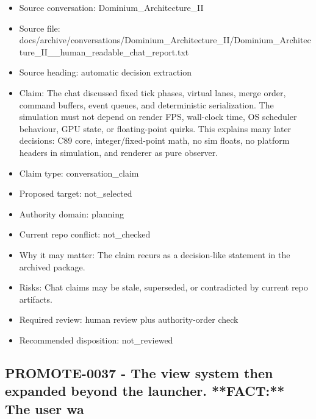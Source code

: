 \documentclass[11pt,a4paper]{report}
\begin{document}
\begin{itemize}
\item Source conversation: Dominium\_Architecture\_II
\item Source file: docs/archive/conversations/Dominium\_Architecture\_II/Dominium\_Architecture\_II\_\_human\_readable\_chat\_report.txt
\item Source heading: automatic decision extraction
\item Claim: The chat discussed fixed tick phases, virtual lanes, merge order, command buffers, event queues, and deterministic serialization. The simulation must not depend on render FPS, wall-clock time, OS scheduler behaviour, GPU state, or floating-point quirks. This explains many later decisions: C89 core, integer/fixed-point math, no sim floats, no platform headers in simulation, and renderer as pure observer.
\item Claim type: conversation\_claim
\item Proposed target: not\_selected
\item Authority domain: planning
\item Current repo conflict: not\_checked
\item Why it may matter: The claim recurs as a decision-like statement in the archived package.
\item Risks: Chat claims may be stale, superseded, or contradicted by current repo artifacts.
\item Required review: human review plus authority-order check
\item Recommended disposition: not\_reviewed
\end{itemize}

\subsection{PROMOTE-0037 - The view system then expanded beyond the launcher. **FACT:** The user wa}
\end{document}
